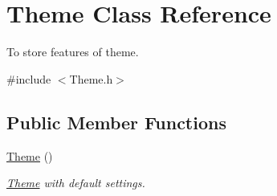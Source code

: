 \hypertarget{class_theme}{\section{Theme Class Reference}
\label{class_theme}
}


To store features of theme.  




{\ttfamily \#include $<$Theme.\-h$>$}

\subsection*{Public Member Functions}
\begin{DoxyCompactItemize}
\item 
\hypertarget{class_theme_a784069702b71190f6fb3f70362310789}{\hyperlink{class_theme_a784069702b71190f6fb3f70362310789}{Theme} ()}\label{class_theme_a784069702b71190f6fb3f70362310789}

\begin{DoxyCompactList}\small\item\em \hyperlink{class_theme}{Theme} with default settings. \end{DoxyCompactList}\end{DoxyCompactItemize}
